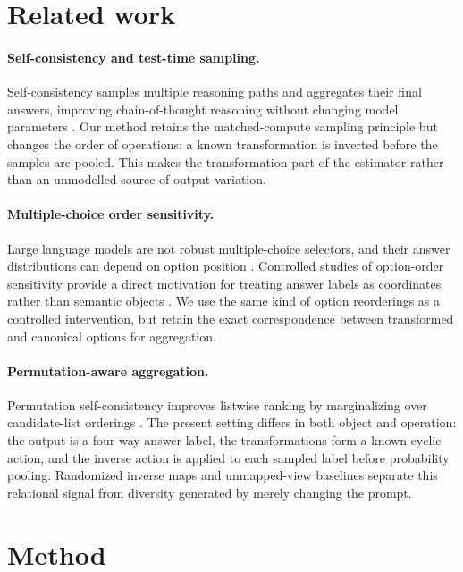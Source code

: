 \documentclass[11pt]{article}
\begin{document}
\section{Related work}

\paragraph{Self-consistency and test-time sampling.}
Self-consistency samples multiple reasoning paths and aggregates their final answers, improving chain-of-thought reasoning without changing model parameters \citep{wang2023selfconsistency}. Our method retains the matched-compute sampling principle but changes the order of operations: a known transformation is inverted before the samples are pooled. This makes the transformation part of the estimator rather than an unmodelled source of output variation.

\paragraph{Multiple-choice order sensitivity.}
Large language models are not robust multiple-choice selectors, and their answer distributions can depend on option position \citep{zheng2023selectors}. Controlled studies of option-order sensitivity provide a direct motivation for treating answer labels as coordinates rather than semantic objects \citep{pezeshkpour2024order}. We use the same kind of option reorderings as a controlled intervention, but retain the exact correspondence between transformed and canonical options for aggregation.

\paragraph{Permutation-aware aggregation.}
Permutation self-consistency improves listwise ranking by marginalizing over candidate-list orderings \citep{tang2024middle}. The present setting differs in both object and operation: the output is a four-way answer label, the transformations form a known cyclic action, and the inverse action is applied to each sampled label before probability pooling. Randomized inverse maps and unmapped-view baselines separate this relational signal from diversity generated by merely changing the prompt.

\section{Method}
\end{document}
